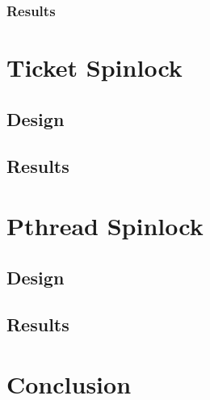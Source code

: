 \documentclass[11pt,fancy,authoryear]{elegantbook}
\begin{document}
\subsection{Results}

\chapter{Ticket Spinlock}

\section{Design}

\section{Results}

\chapter{Pthread Spinlock}

\section{Design}

\section{Results}

\chapter{Conclusion}
\end{document}
